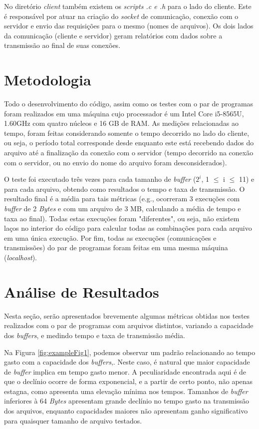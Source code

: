 \documentclass[a4paper, 12pt]{article}
\begin{document}
No diretório \emph{client} também existem os \emph{scripts .c e .h} para o lado do cliente. Este é responsável por atuar na criação do \emph{socket} de comunicação, conexão com o servidor e envio das requisições para o mesmo (nomes de arquivos). Os dois lados da comunicação (cliente e servidor) geram relatórios com dados sobre a transmissão ao final de suas conexões.

\section{Metodologia}

Todo o desenvolvimento do código, assim como os testes com o par de programas foram realizados em uma máquina cujo processador é um Intel Core i5-8565U, 1.60GHz com quatro núcleos e 16 GB de RAM. As medições relacionadas ao tempo, foram feitas considerando somente o tempo decorrido no lado do cliente, ou seja, o período total corresponde desde enquanto este está recebendo dados do arquivo até a finalização da conexão com o servidor (tempo decorrido na conexão com o servidor, ou no envio do nome do arquivo foram desconsiderados).

O teste foi executado três vezes para cada tamanho de \emph{buffer} (\(2^i\), 1 \(\leq\) i \(\leq\) 11) e para cada arquivo, obtendo como resultados o tempo e taxa de transmissão. O resultado final é a média para tais métricas (e.g., ocorreram 3 execuções com \emph{buffer} de 2 \emph{Bytes} e com um arquivo de 3 MB, calculando a média de tempo e taxa ao final). Todas estas execuções foram "diferentes", ou seja, não existem laços no interior do código para calcular todas as combinações para cada arquivo em uma única execução. Por fim, todas as execuções (comunicações e transmissões) do par de programas foram feitas em uma mesma máquina (\emph{localhost}).

\section{Análise de Resultados}

Nesta seção, serão apresentados brevemente algumas métricas obtidas nos testes realizados com o par de programas com arquivos distintos, variando a capacidade dos \emph{buffers}, e medindo tempo e taxa de transmissão média. 

Na Figura \ref{fig:exampleFig1}, podemos observar um padrão relacionando ao tempo gasto com a capacidade dos \emph{buffers},. Neste caso, é natural que maior capacidade de \emph{buffer} implica em tempo gasto menor. A peculiaridade encontrada aqui é de que o declínio ocorre de forma exponencial, e a partir de certo ponto, não apenas estagna, como apresenta uma elevação mínima nos tempos. Tamanhos de \emph{buffer} inferiores à 64 \emph{Bytes} apresentam grande declínio no tempo gasto na transmissão dos arquivos, enquanto capacidades maiores não apresentam ganho significativo para quaisquer tamanho de arquivo testados.
\end{document}
